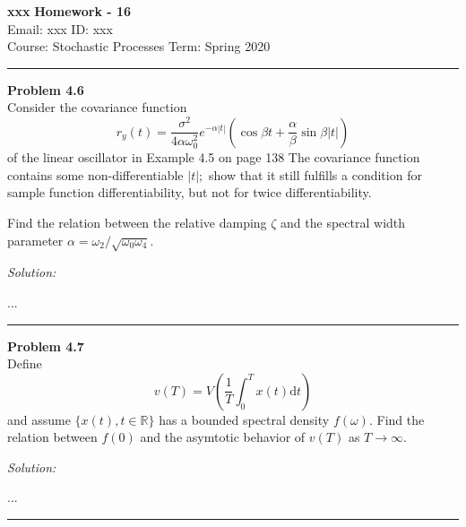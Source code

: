 \documentclass[a4paper, 11pt]{article}
\newenvironment{problem}[2][Problem]
    { \begin{mdframed}[backgroundcolor=gray!20] \textbf{#1 #2} \\}
    {  \end{mdframed}}
\newenvironment{solution}
    {\textit{Solution:}}
    {}
\begin{document}
\noindent
\large\textbf{xxx} \hfill \textbf{Homework - 16}   \\
Email: xxx \hfill ID: xxx \\
\normalsize Course: Stochastic Processes \hfill Term: Spring 2020\\
\noindent\rule{7in}{2.8pt}

\begin{problem}{4.6}
	 Consider the covariance function
	\[
	r_{y}(t)=\frac{\sigma^{2}}{4 \alpha \omega_{0}^{2}} e^{-\alpha|t|}\left(\cos \beta t+\frac{\alpha}{\beta} \sin \beta|t|\right)
	\]
	of the linear oscillator in Example 4.5 on page 138 The covariance function contains some non-differentiable $|t| ;$ show that it still fulfills a condition for sample function differentiability, but not for twice differentiability.
	
	Find the relation between the relative damping $\zeta$ and the spectral width parameter $\alpha=\omega_{2} / \sqrt{\omega_{0} \omega_{4}}.$ 
\end{problem}
\begin{solution}

...

\end{solution} 

\noindent\rule{7in}{2.8pt}


\begin{problem}{4.7}
Define
\[
v(T)=V\left(\frac{1}{T} \int_{0}^{T} x(t) \mathrm{d} t\right)
\]
and assume $\{x(t), t \in \mathbb{R}\}$ has a bounded spectral density $f(\omega)$. Find the relation between $f(0)$ and the asymtotic behavior of $v(T)$ as $T \rightarrow \infty.$
\end{problem}
\begin{solution}

...

\end{solution} 

\noindent\rule{7in}{2.8pt}
\end{document}
